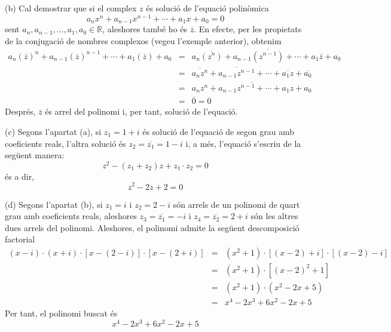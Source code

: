\begin{solucio}
(b) Cal demostrar que si el complex $z$ és solució de l’equació polinòmica
\begin{equation*}
a_{n}x^{n}+a_{n-1}x^{n-1}+\cdots +a_{1}x+a_{0}=0
\end{equation*}
sent $a_{n},a_{n-1},...,a_{1},a_{0}\in \mathbb{R}$, aleshores també
ho és $\overline{z}$. En efecte, per les propietats de la conjugació
de nombres complexos (vegeu l’exemple anterior), obtenim
\begin{eqnarray*}
a_{n}\left( \overline{z}\right) ^{n}+a_{n-1}\left( \overline{z}\right)
^{n-1}+\cdots +a_{1}\left( \overline{z}\right) +a_{0} &=&a_{n}\overline{
\left( z^{n}\right) }+a_{n-1}\overline{\left( z^{n-1}\right) }+\cdots +a_{1}
\overline{z}+a_{0} \\
&=&\overline{a_{n}z^{n}}+\overline{a_{n-1}z^{n-1}}+\cdots +\overline{a_{1}z}+
\overline{a_{0}} \\
&=&\overline{a_{n}z^{n}+a_{n-1}z^{n-1}+\cdots +a_{1}z+a_{0}} \\
&=&\overline{0}=0
\end{eqnarray*}
Després, $\overline{z}$ és arrel del polinomi i, per tant, solució
de l’equació.

(c) Segons l’apartat (a), si $z_{1}=1+i$ és solució de l’equació de segon grau amb coeficients reals, l’altra solució és $
z_{2}=\overline{z_{1}}=1-i$ i, a més, l’equació s’escriu de la
següent manera:
\begin{equation*}
z^{2}-(z_{1}+z_{2})z+z_{1}\cdot z_{2}=0
\end{equation*}
és a dir,
\begin{equation*}
z^{2}-2z+2=0
\end{equation*}

(d) Segons l’apartat (b), si $z_{1}=i$ i $z_{2}=2-i$ són arrels de
un polinomi de quart grau amb coeficients reals, aleshores \thinspace $
z_{3}=\overline{z_{1}}=-i$ i $z_{4}=\overline{z_{2}}=2+i$ són les altres dues
arrels del polinomi. Aleshores, el polinomi admite la següent
descomposició factorial
\begin{eqnarray*}
(x-i)\cdot (x+i)\cdot \left[ x-(2-i)\right] \cdot \left[ x-(2+i)\right]
&=&(x^{2}+1)\cdot \left[ \left( x-2\right) +i\right] \cdot \left[ (x-2)-i
\right] \\
&=&(x^{2}+1)\cdot \left[ (x-2)^{2}+1\right] \\
&=&(x^{2}+1)\cdot (x^{2}-2x+5) \\
&=&x^{4}-2x^{3}+6x^{2}-2x+5
\end{eqnarray*}
Per tant, el polinomi buscat és
\begin{equation*}
x^{4}-2x^{3}+6x^{2}-2x+5
\end{equation*}
\end{solucio}

